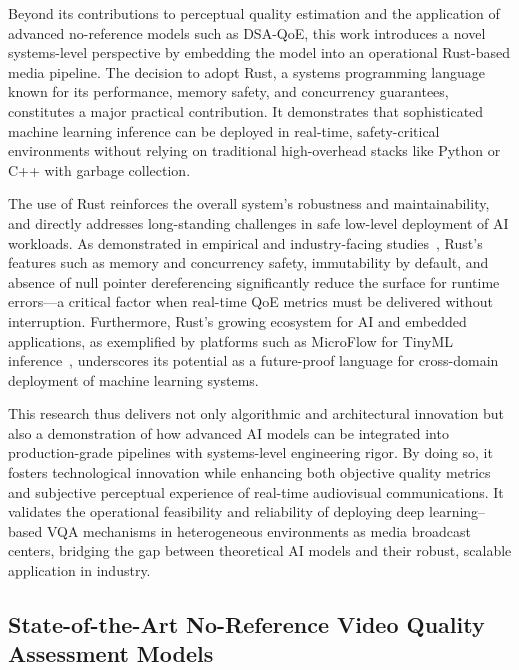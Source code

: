 Beyond its contributions to perceptual quality estimation and the application of advanced no-reference models such as DSA-QoE, this work introduces a novel systems-level perspective by embedding the model into an operational Rust-based media pipeline. The decision to adopt Rust, a systems programming language known for its performance, memory safety, and concurrency guarantees, constitutes a major practical contribution. It demonstrates that sophisticated machine learning inference can be deployed in real-time, safety-critical environments without relying on traditional high-overhead stacks like Python or C++ with garbage collection.

The use of Rust reinforces the overall system’s robustness and maintainability, and directly addresses long-standing challenges in safe low-level deployment of AI workloads. As demonstrated in empirical and industry-facing studies~\cite{fulton2022benefits}, Rust’s features such as memory and concurrency safety, immutability by default, and absence of null pointer dereferencing significantly reduce the surface for runtime errors---a critical factor when real-time QoE metrics must be delivered without interruption. Furthermore, Rust’s growing ecosystem for AI and embedded applications, as exemplified by platforms such as MicroFlow for TinyML inference~\cite{carnelos2025microflow}, underscores its potential as a future-proof language for cross-domain deployment of machine learning systems.

This research thus delivers not only algorithmic and architectural innovation but also a demonstration of how advanced AI models can be integrated into production-grade pipelines with systems-level engineering rigor. By doing so, it fosters technological innovation while enhancing both objective quality metrics and subjective perceptual experience of real-time audiovisual communications. It validates the operational feasibility and reliability of deploying deep learning–based VQA mechanisms in heterogeneous environments as media broadcast centers, bridging the gap between theoretical AI models and their robust, scalable application in industry.

\subsection{State-of-the-Art No-Reference Video Quality Assessment Models}

